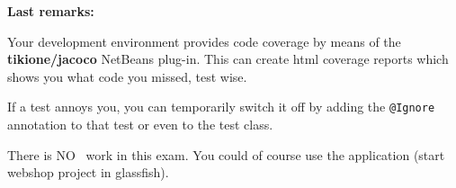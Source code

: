 \textbf{Last remarks:}
\begin{itemize*}
\item Your development environment provides code coverage by means of the
\textbf{tikione/jacoco} NetBeans plug-in. This can create html
coverage reports which shows you what code you missed, test wise.
\item If a test annoys you, you can temporarily switch it off by adding the
\lstinline{@Ignore} annotation to that test or even to the test class.


\item There is NO \ work in this exam. You could of course use the
application (start webshop project in glassfish).


\end{itemize*}
